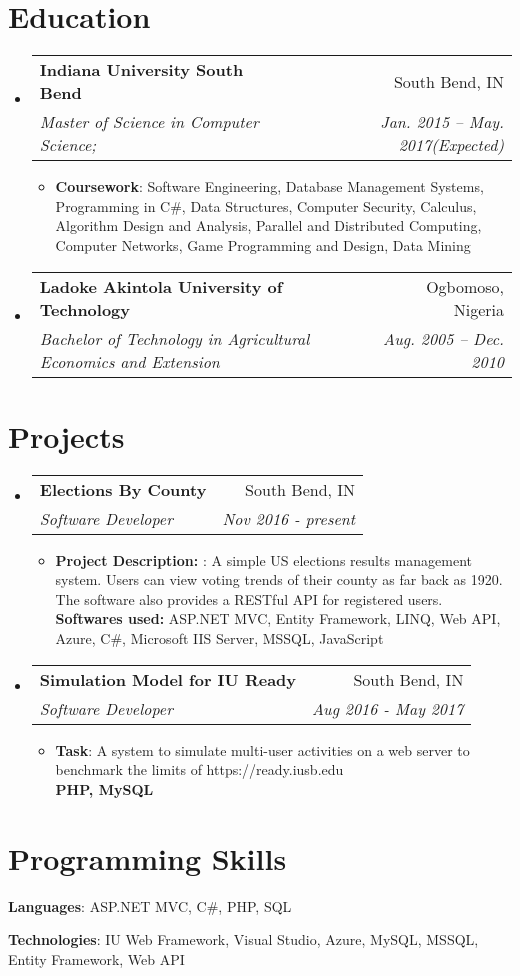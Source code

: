 \documentclass[letterpaper,11pt]{article}
\makeatletter
\newcommand{\resumeItem}[2]{
  \item\small{
    \textbf{#1}{: #2 \vspace{-2pt}}
  }
}
\newcommand{\resumeSubheading}[4]{
  \vspace{-1pt}\item
    \begin{tabular*}{0.97\textwidth}{l@{\extracolsep{\fill}}r}
      \textbf{#1} & #2 \\
      \textit{\small#3} & \textit{\small #4} \\
    \end{tabular*}\vspace{-5pt}
}
\newcommand{\resumeSubHeadingListStart}{\begin{itemize}[leftmargin=*]}
\newcommand{\resumeSubHeadingListEnd}{\end{itemize}}
\newcommand{\resumeItemListStart}{\begin{itemize}}
\newcommand{\resumeItemListEnd}{\end{itemize}\vspace{-5pt}}
\makeatother
\begin{document}
\section{Education}
  \resumeSubHeadingListStart
    \resumeSubheading
      {Indiana University South Bend}{South Bend, IN}
      {Master of Science in Computer Science;  \comment{GPA: 3.50}}{Jan. 2015 -- May. 2017(Expected)}
     \resumeItemListStart
        \resumeItem{Coursework}
          {Software Engineering, Database Management Systems, Programming in C\#, Data Structures, Computer Security, Calculus, Algorithm Design and Analysis, Parallel and Distributed Computing,  Computer Networks, Game Programming and Design, Data Mining}
      \resumeItemListEnd
    \resumeSubheading
      {Ladoke Akintola University of Technology}{Ogbomoso, Nigeria}
      {Bachelor of Technology in Agricultural Economics and Extension}{Aug. 2005 -- Dec. 2010}
  \resumeSubHeadingListEnd


\section{Projects}
  \resumeSubHeadingListStart
     \resumeSubheading
      {Elections By County}{South Bend, IN}
      {Software Developer}{Nov 2016 - present}
      \resumeItemListStart
        \resumeItem{Project Description: }
          {A simple US elections results management system. Users can view voting trends of their county as far back as 1920. The software also provides a RESTful API for registered users. }\\
          \textbf{Softwares used: }{ASP.NET MVC, Entity Framework, LINQ, Web API, Azure, C\#, Microsoft IIS Server, MSSQL, JavaScript}
      \resumeItemListEnd
      
       \resumeSubheading
      {Simulation Model for IU Ready}{South Bend, IN}
      {Software Developer}{Aug 2016 - May 2017}
      \resumeItemListStart
        \resumeItem{Task}
          {A system to simulate multi-user activities on a web server to benchmark the limits of https://ready.iusb.edu}\\
          \textbf{PHP, MySQL}
      \resumeItemListEnd
  \resumeSubHeadingListEnd


\section{Programming Skills}
 \resumeSubHeadingListStart
    \item{
     \textbf{Languages}{: ASP.NET MVC, C\#, PHP, SQL}
     \hfill \\
    \item{
    \textbf{Technologies}{: IU Web Framework, Visual Studio, Azure, MySQL, MSSQL, Entity Framework, Web API}
    }}
 \resumeSubHeadingListEnd
\end{document}
